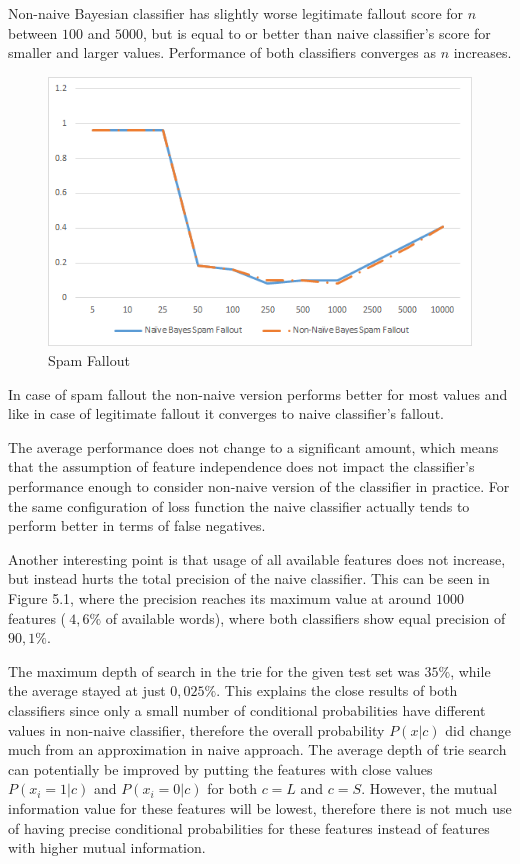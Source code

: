 \documentclass[12pt]{report}
\begin{document}
Non-naive Bayesian classifier has slightly worse legitimate fallout score for $n$ between $100$ and $5000$, but is equal to or better than naive classifier's score for smaller and larger values. Performance of both classifiers converges as $n$ increases.

\begin{figure}[ht!]
	\centering
	\includegraphics[width=120mm]{SpamFallout.png}
	\caption{Spam Fallout}
	\label{SpamFalloutGraph}
\end{figure}

In case of spam fallout the non-naive version performs better for most values and like in case of legitimate fallout it converges to naive classifier's fallout.

The average performance does not change to a significant amount, which means that the assumption of feature independence does not impact the classifier's performance enough to consider non-naive version of the classifier in practice. For the same configuration of loss function the naive classifier actually tends to perform better in terms of false negatives.

Another interesting point is that usage of all available features does not increase, but instead hurts the total precision of the naive classifier. This can be seen in Figure 5.1, where the precision reaches its maximum value at around $1000$ features ($~4,6\%$ of available words), where both classifiers show equal precision of $90,1\%$.

The maximum depth of search in the trie for the given test set was $35\%$, while the average stayed at just $0,025\%$. This explains the close results of both classifiers since only a small number of conditional probabilities have different values in non-naive classifier, therefore the overall probability $P(x | c)$ did change much from an approximation in naive approach. The average depth of trie search can potentially be improved by putting the features with close values $P(x_i = 1 | c)$ and $P(x_i = 0 | c)$ for both $c = L$ and $c = S$. However, the mutual information value for these features will be lowest, therefore there is not much use of having precise conditional probabilities for these features instead of features with higher mutual information.
\end{document}
